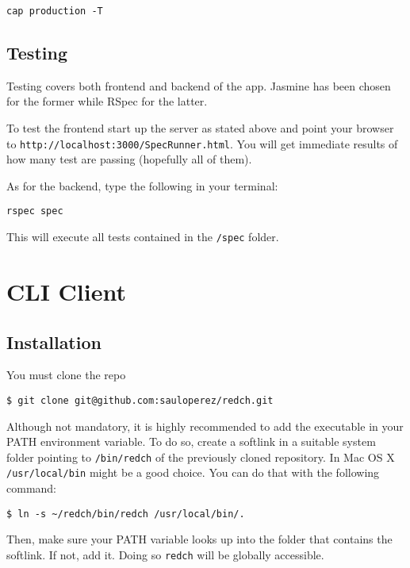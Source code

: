 \begin{verbatim}
cap production -T
\end{verbatim}

\subsection*{Testing}\label{testing}

Testing covers both frontend and backend of the app. Jasmine has been
chosen for the former while RSpec for the latter.

To test the frontend start up the server as stated above and point your
browser to \texttt{http://localhost:3000/SpecRunner.html}. You will get
immediate results of how many test are passing (hopefully all of them).

As for the backend, type the following in your terminal:

\begin{verbatim}
rspec spec
\end{verbatim}

This will execute all tests contained in the \texttt{/spec} folder.


\section{CLI Client}\label{doc-cli-client}

\subsection*{Installation}\label{installation}

You must clone the repo

\begin{verbatim}
$ git clone git@github.com:sauloperez/redch.git
\end{verbatim}

Although not mandatory, it is highly recommended to add the executable
in your PATH environment variable. To do so, create a softlink in a
suitable system folder pointing to \texttt{/bin/redch} of the previously
cloned repository. In Mac OS X \texttt{/usr/local/bin} might be a good
choice. You can do that with the following command:

\begin{verbatim}
$ ln -s ~/redch/bin/redch /usr/local/bin/.
\end{verbatim}

Then, make sure your PATH variable looks up into the folder that
contains the softlink. If not, add it. Doing so \texttt{redch} will be
globally accessible.

